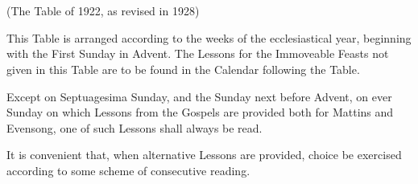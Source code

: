 \chapter[Table of Lessons]{}
\centerline{(The Table of 1922, as revised in 1928)}

This Table is arranged according to the weeks of the ecclesiastical year, beginning with the First Sunday in Advent.  The Lessons for the Immoveable Feasts not given in this Table are to be found in the Calendar following the Table.

Except on Septuagesima Sunday, and the Sunday next before Advent, on ever Sunday on which Lessons from the Gospels are provided both for Mattins and Evensong, one of such Lessons shall always be read.

It is convenient that, when alternative Lessons are provided, choice be exercised according to some scheme of consecutive reading.





    
